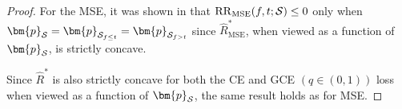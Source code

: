 \documentclass[letterpaper]{article} %
\newcommand{\bp}{{\bm{p}}}
\newcommand{\cP}{{\cal{P}}}
\newcommand{\cS}{{\cal{S}}}
\newcommand{\RR}{{\rm RR}}
\begin{document}
\begin{proof}
    For the MSE, it was shown in \cite{breiman1984classification} that $\RR_{\mathrm{MSE}}(f,t;\cS)\leq 0$ only when $\bp_{\cS}=\bp_{\cS_{f\leq t}}=\bp_{\cS_{f > t}}$ since $\widehat{R}_{\mathrm{MSE}}^*$, 
    when viewed as a function of $\bp_{\cS}$, 
    is strictly concave.
    
    Since $\widehat{R}^*$ is also strictly concave for both the CE and GCE $(q\in(0,1))$ loss when viewed as a function of $\bp_{\cS}$, the same result holds as for MSE.
\end{proof}
 
\end{document}

